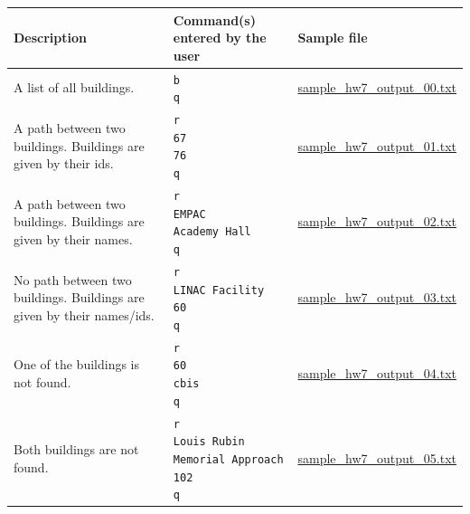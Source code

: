 \documentclass[11pt]{article}
\begin{document}
\begin{center}
\begin{tabular}{ | m{5cm} | m{5cm}| m{5cm} | } 
  \hline
  \textbf{Description} & \textbf{Command(s) entered by the user} & \textbf{Sample file} \\ 
  \hline
  A list of all buildings. & \texttt{b \newline q} & \href{https://www.cs.rpi.edu/academics/courses/spring23/csci2600/Documents/sample_hw7_output_00.txt}{sample\_hw7\_output\_00.txt}\\ 
  \hline
  A path between two buildings. Buildings are given by their ids. & \texttt{r \newline 67 \newline 76 \newline q} & \href{https://www.cs.rpi.edu/academics/courses/spring23/csci2600/Documents/sample_hw7_output_01.txt}{sample\_hw7\_output\_01.txt} \\ 
  \hline
  A path between two buildings. Buildings are given by their names. & \texttt{r \newline EMPAC \newline Academy Hall \newline q} & \href{https://www.cs.rpi.edu/academics/courses/spring23/csci2600/Documents/sample_hw7_output_02.txt}{sample\_hw7\_output\_02.txt} \\
  \hline
  No path between two buildings. Buildings are given by their names/ids. & \texttt{r \newline LINAC Facility \newline 60 \newline q} & \href{https://www.cs.rpi.edu/academics/courses/spring23/csci2600/Documents/sample_hw7_output_03.txt}{sample\_hw7\_output\_03.txt} \\
  \hline
  One of the buildings is not found. & \texttt{r \newline 60 \newline cbis \newline q} & \href{https://www.cs.rpi.edu/academics/courses/spring23/csci2600/Documents/sample_hw7_output_04.txt}{sample\_hw7\_output\_04.txt} \\
  \hline
  Both buildings are not found. & \texttt{r \newline Louis Rubin Memorial Approach \newline 102 \newline q} & \href{https://www.cs.rpi.edu/academics/courses/spring23/csci2600/Documents//sample_hw7_output_05.txt}{sample\_hw7\_output\_05.txt} \\

\end{tabular}
\end{center}
\end{document}
